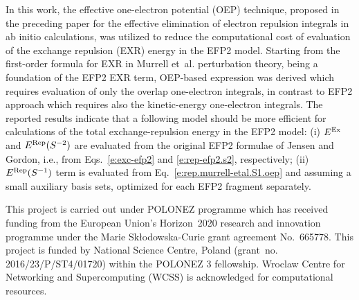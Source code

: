 \documentclass[aip,jcp,amsmath,amssymb,preprint,floatfix]{revtex4-1}
\begin{document}
In this work, the effective one-electron potential (OEP) technique,
proposed in the preceding paper for the
effective elimination of electron
repulsion integrals in ab initio calculations,
was utilized to reduce the computational cost
of evaluation of the exchange repulsion (EXR) energy in the EFP2 model.
Starting from the first-order formula for EXR in Murrell et~al. perturbation theory, 
being a foundation of the EFP2 EXR term,
OEP\hyp{}based expression was derived which requires evaluation of
only the overlap one-electron integrals, in contrast to EFP2
approach which requires also the kinetic-energy one-electron
integrals. 
The reported results indicate that a following model should be more
efficient for calculations of the 
total exchange\hyp{}repulsion energy in the EFP2 model: 
(i) $E^{\rm Ex}$ and $E^{\rm Rep}(S^{-2})$ are evaluated
from the original EFP2 formulae of Jensen and Gordon, i.e.,
from Eqs.~\eqref{e:exc-efp2} and \eqref{e:rep-efp2.s2}, respectively;
(ii) $E^{\rm Rep}(S^{-1})$ term is evaluated from Eq.~\eqref{e:rep.murrell-etal.S1.oep}
and assuming a small auxiliary basis sets, optimized for each
EFP2 fragment separately.


\begin{acknowledgments}
This project is carried out under POLONEZ programme which has received funding from the European Union's
Horizon~2020 research and innovation programme under the Marie Sk{\l}odowska-Curie grant agreement 
No.~665778. This project is funded by National Science Centre, Poland 
(grant~no. 2016/23/P/ST4/01720) within the POLONEZ 3 fellowship.
Wroclaw Centre for Networking and Supercomputing (WCSS) is acknowledged for
computational resources.
\end{acknowledgments}




\end{document}
